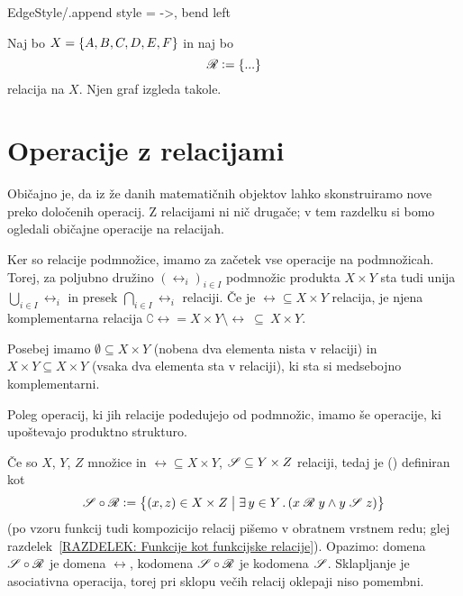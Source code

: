 		\GraphInit[vstyle = Normal]
		\tikzset
		{
			EdgeStyle/.append style = {->, bend left}
		}
		
		\begin{zgled}\label{ZGLED: graf relacije}
			Naj bo $X = \set{A, B, C, D, E, F}$ in naj bo
			\[\rel \dfeq \set{...}\]
			relacija na $X$. Njen graf izgleda takole.
			
		\end{zgled}
	
	
	\section{Operacije z relacijami}\label{RAZDELEK: Operacije z relacijami}
	
		Običajno je, da iz že danih matematičnih objektov lahko skonstruiramo nove preko določenih operacij. Z relacijami ni nič drugače; v tem razdelku si bomo ogledali običajne operacije na relacijah.
		
		Ker so relacije podmnožice, imamo za začetek vse operacije na podmnožicah. Torej, za poljubno družino $(\rel_i)_{i \in I}$ podmnožic produkta $X \times Y$ sta tudi unija $\bigcup_{i \in I} \rel_i$ in presek $\bigcap_{i \in I} \rel_i$ relaciji. Če je $\rel \subseteq X \times Y$ relacija, je njena komplementarna relacija $\complement{\rel} = X \times Y \setminus \rel \ \subseteq \ X \times Y$.
		
		Posebej imamo  $\emptyset \subseteq X \times Y$ (nobena dva elementa nista v relaciji) in  $X \times Y \subseteq X \times Y$ (vsaka dva elementa sta v relaciji), ki sta si medsebojno komplementarni.
		
		Poleg operacij, ki jih relacije podedujejo od podmnožic, imamo še operacije, ki upoštevajo produktno strukturo.
		
		Če so $X$, $Y$, $Z$ množice in $\rel \subseteq X \times Y$, $\srel \subseteq Y \times Z$ relaciji, tedaj je  ()  definiran kot
		\[\srel \circ \rel \dfeq \set[1]{(x, z) \in X \times Z}{\some{y}[Y]{\rel[x][y] \land \srel[y][z]}}\]
		(po vzoru funkcij tudi kompozicijo relacij pišemo v obratnem vrstnem redu; glej razdelek~\ref{RAZDELEK: Funkcije kot funkcijske relacije}). Opazimo: domena $\srel \circ \rel$ je domena $\rel$, kodomena $\srel \circ \rel$ je kodomena $\srel$. Sklapljanje je asociativna operacija, torej pri sklopu večih relacij oklepaji niso pomembni.
		

